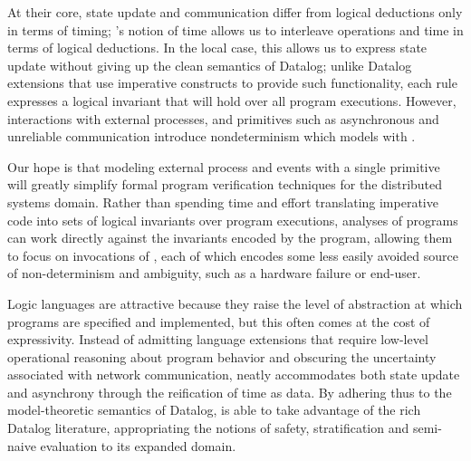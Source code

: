 
At their core, state update and communication differ from logical
deductions only in terms of timing; \lang's notion of time allows us
to interleave operations and time in terms of logical deductions.
In the local case, this allows us to express state update without giving up the clean semantics of Datalog; unlike
Datalog extensions that use imperative constructs to provide such
functionality, each \lang rule expresses a logical invariant that will
hold over all program executions.  
However, interactions with external processes, and primitives such as
asynchronous and unreliable communication introduce nondeterminism
which \lang models with .  

Our hope is that modeling external process and events with a single
primitive will greatly simplify formal program verification techniques for the distributed systems domain.  Rather
than spending time and effort translating imperative code into sets of logical
invariants over program executions, analyses of \lang programs can
work directly against the invariants encoded by the program, allowing
them to focus on invocations of , each of which
encodes some less easily avoided source of non-determinism and
ambiguity, such as a hardware failure or end-user.

Logic languages are attractive because they raise the level of abstraction at which programs are specified
and implemented, but this often comes at the cost of expressivity.  Instead of admitting language extensions that require low-level 
operational reasoning about program behavior and obscuring the uncertainty associated with network communication, \lang 
neatly accommodates both state update and asynchrony through the reification of time as data.  By adhering thus to the model-theoretic
semantics of Datalog, \lang is able to take advantage of the rich Datalog literature, appropriating the notions of safety, stratification
and semi-naive evaluation to its expanded domain.  




